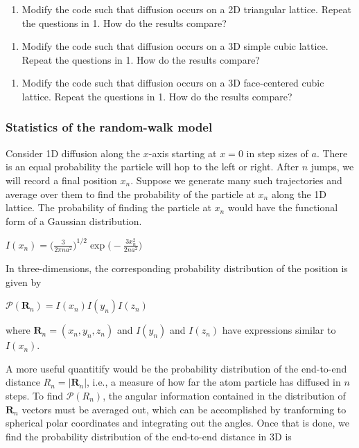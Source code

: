 \documentclass[11pt]{article}
\providecommand{\tightlist}{%
      \setlength{\itemsep}{0pt}\setlength{\parskip}{0pt}}
\begin{document}
    \begin{enumerate}
\def\labelenumi{\arabic{enumi}.}
\setcounter{enumi}{1}
\tightlist
\item
  Modify the code such that diffusion occurs on a 2D triangular lattice.
  Repeat the questions in 1. How do the results compare?
\end{enumerate}

    \begin{enumerate}
\def\labelenumi{\arabic{enumi}.}
\setcounter{enumi}{2}
\tightlist
\item
  Modify the code such that diffusion occurs on a 3D simple cubic
  lattice. Repeat the questions in 1. How do the results compare?
\end{enumerate}

    \begin{enumerate}
\def\labelenumi{\arabic{enumi}.}
\setcounter{enumi}{3}
\tightlist
\item
  Modify the code such that diffusion occurs on a 3D face-centered cubic
  lattice. Repeat the questions in 1. How do the results compare?
\end{enumerate}

    \hypertarget{statistics-of-the-random-walk-model}{%
\subsubsection{Statistics of the random-walk
model}\label{statistics-of-the-random-walk-model}}

Consider 1D diffusion along the $x$-axis starting at $x = 0$ in step
sizes of $a$. There is an equal probability the particle will hop to
the left or right. After $n$ jumps, we will record a final position
$x_n$. Suppose we generate many such trajectories and average over
them to find the probability of the particle at $x_n$ along the 1D
lattice. The probability of finding the particle at $x_n$ would have
the functional form of a Gaussian distribution.

$I(x_n) = \Big(\frac{3}{2\pi n a^2}\Big)^{1/2} \exp\Big(-\frac{3x_n^2}{2n a^2}\Big)$

In three-dimensions, the corresponding probability distribution of the
position is given by

$\mathcal{P}(\textbf{R}_n) = I(x_n)I(y_n)I(z_n)$

where $\textbf{R}_n = (x_n, y_n, z_n)$ and $I(y_n)$ and $I(z_n)$
have expressions similar to $I(x_n)$.

A more useful quantitify would be the probability distribution of the
end-to-end distance $R_n = |\textbf{R}_n|$, i.e., a measure of how far
the atom particle has diffused in $n$ steps. To find
$\mathcal{P}(R_n)$, the angular information contained in the
distribution of $\textbf{R}_n$ vectors must be averaged out, which can
be accomplished by tranforming to spherical polar coordinates and
integrating out the angles. Once that is done, we find the probability
distribution of the end-to-end distance in 3D is
\end{document}
